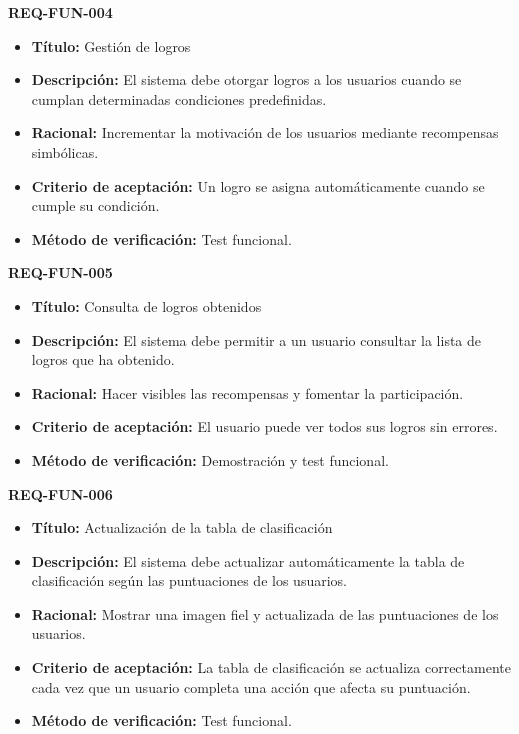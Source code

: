 \textbf{REQ-FUN-004}
\begin{itemize}
    \item \textbf{Título:} Gestión de logros
    \item \textbf{Descripción:} El sistema debe otorgar logros a los usuarios cuando se cumplan determinadas condiciones predefinidas.
    \item \textbf{Racional:} Incrementar la motivación de los usuarios mediante recompensas simbólicas.
    \item \textbf{Criterio de aceptación:} Un logro se asigna automáticamente cuando se cumple su condición.
    \item \textbf{Método de verificación:} Test funcional.


\end{itemize}

\textbf{REQ-FUN-005}
\begin{itemize}
    \item \textbf{Título:} Consulta de logros obtenidos
    \item \textbf{Descripción:} El sistema debe permitir a un usuario consultar la lista de logros que ha obtenido.
    \item \textbf{Racional:} Hacer visibles las recompensas y fomentar la participación.
    \item \textbf{Criterio de aceptación:} El usuario puede ver todos sus logros sin errores.
    \item \textbf{Método de verificación:} Demostración y test funcional.
\end{itemize}

\textbf{REQ-FUN-006}
\begin{itemize}
    \item \textbf{Título:} Actualización de la tabla de clasificación
    \item \textbf{Descripción:} El sistema debe actualizar automáticamente la tabla de clasificación según las puntuaciones de los usuarios.
    \item \textbf{Racional:} Mostrar una imagen fiel y actualizada de las puntuaciones de los usuarios.
    \item \textbf{Criterio de aceptación:} La tabla de clasificación se actualiza correctamente cada vez que un usuario completa una acción que afecta su puntuación.
    \item \textbf{Método de verificación:} Test funcional.
\end{itemize}

